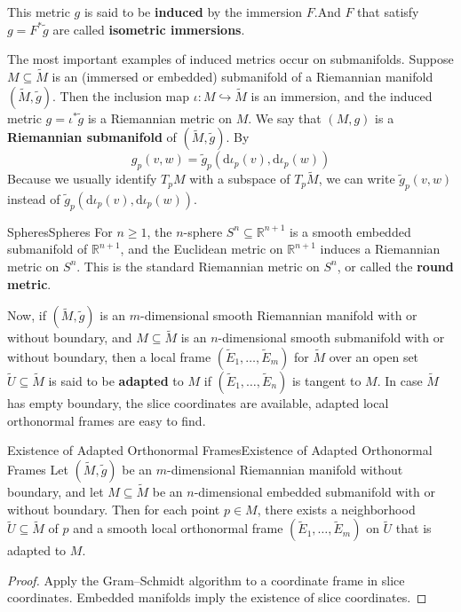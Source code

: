 \documentclass[../main.tex]{subfiles}
\begin{document}
This metric $g$ is said to be \textbf{induced} by the immersion $F$.And $F$ that satisfy $g = F^*\tilde{g}$ are called \textbf{isometric immersions}.

The most important examples of induced metrics occur on submanifolds. Suppose $M \subseteq \tilde{M}$ is an (immersed or embedded) submanifold of a Riemannian manifold $(\tilde{M}, \tilde{g})$. Then the inclusion map $\iota: M \hookrightarrow \tilde{M}$ is an immersion, and the induced metric $g = \iota^*\tilde{g}$ is a Riemannian metric on $M$. We say that $(M, g)$ is a \textbf{Riemannian submanifold} of $(\tilde{M}, \tilde{g})$. By
\begin{equation}
	g_p(v, w) = \tilde{g}_p(\mathrm{d} \iota_p(v), \mathrm{d} \iota_p(w))
\end{equation}
Because we usually identify $T_pM$ with a subspace of $T_p\tilde{M}$, we can write $\tilde{g}_p(v, w)$ instead of $\tilde{g}_p(\mathrm{d} \iota_p(v), \mathrm{d} \iota_p(w))$.

\begin{example}{Spheres}{Spheres}
	For $n \geq 1$, the $n$-sphere $S^n \subseteq \mathbb{R}^{n+1}$ is a smooth embedded submanifold of $\mathbb{R}^{n+1}$, and the Euclidean metric on $\mathbb{R}^{n+1}$ induces a Riemannian metric on $S^n$. This is the standard Riemannian metric on $S^n$, or called the \textbf{round metric}.
\end{example}

Now, if $(\tilde{M}, \tilde{g})$ is an $m$-dimensional smooth Riemannian manifold with or without boundary, and $M \subseteq \tilde{M}$ is an $n$-dimensional smooth submanifold with or without boundary, then a local frame $(\tilde{E}_1, \ldots, \tilde{E}_m)$ for $\tilde{M}$ over an open set $\tilde{U} \subseteq \tilde{M}$ is said to be \textbf{adapted} to $M$ if $(\tilde{E}_1, \ldots, \tilde{E}_n)$ is tangent to $M$. In case $\tilde{M}$ has empty boundary, the slice coordinates are available, adapted local orthonormal frames are easy to find.

\begin{proposition}{Existence of Adapted Orthonormal Frames}{Existence of Adapted Orthonormal Frames}
	Let $(\tilde{M}, \tilde{g})$ be an $m$-dimensional Riemannian manifold without boundary, and let $M \subseteq \tilde{M}$ be an $n$-dimensional embedded submanifold with or without boundary. Then for each point $p \in M$, there exists a neighborhood $\tilde{U} \subseteq \tilde{M}$ of $p$ and a smooth local orthonormal frame $(\tilde{E}_1, \ldots, \tilde{E}_m)$ on $\tilde{U}$ that is adapted to $M$.
\end{proposition}
\begin{proof}
	Apply the Gram–Schmidt algorithm to a coordinate frame in slice coordinates. Embedded manifolds imply the existence of slice coordinates.
\end{proof}
\end{document}
